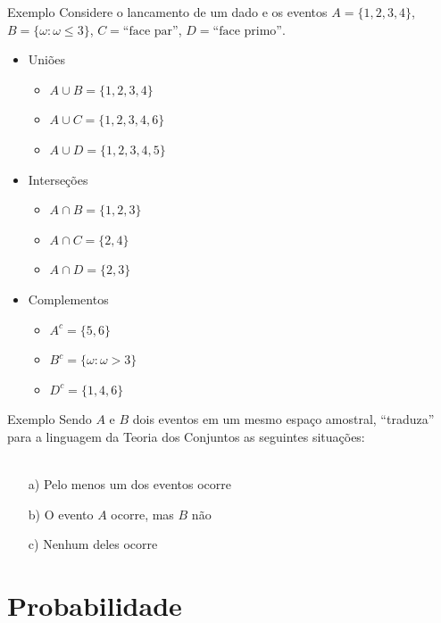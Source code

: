 \documentclass[10pt]{beamer}\usepackage[]{graphicx}\usepackage[]{color}
\theoremstyle{definition}
\begin{document}
\begin{frame}[fragile]{Exemplo}
  Considere o lancamento de um dado e os eventos $A = \{1,2,3,4\}$, $B =
  \{\omega:\omega\leq 3\}$, $C = \text{``face par''}$, $D = \text{``face
    primo''}$.
  \begin{itemize}
  \item Uniões
    \begin{itemize}
    \item $A\cup B = \{1,2,3,4\}$
    \item $A\cup C = \{1,2,3,4,6\}$
    \item $A\cup D = \{1,2,3,4,5\}$
    \end{itemize}
  \end{itemize}
  \begin{itemize}
  \item Interseções
    \begin{itemize}
    \item $A\cap B = \{1,2,3\}$
    \item $A\cap C = \{2,4\}$
    \item $A\cap D = \{2,3\}$
    \end{itemize}
  \end{itemize}
  \begin{itemize}
  \item Complementos
    \begin{itemize}
    \item $A^c = \{5,6\}$
    \item $B^c = \{\omega: \omega> 3\}$
    \item $D^c = \{1,4,6\}$
    \end{itemize}
  \end{itemize}
\end{frame}

\begin{frame}[fragile]{Exemplo}
  Sendo $A$ e $B$ dois eventos em um mesmo espaço amostral, ``traduza''
  para a linguagem da Teoria dos Conjuntos as seguintes situações: \\~\\
  \begin{itemize}
  \item[a)] Pelo menos um dos eventos ocorre
  \item[b)] O evento $A$ ocorre, mas $B$ não
  \item[c)] Nenhum deles ocorre
  \end{itemize}
\end{frame}


\section{Probabilidade}
\end{document}
